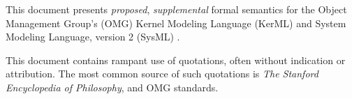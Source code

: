 

This document presents \emph{proposed}, \emph{supplemental} formal semantics for the Object Management Group's (OMG) Kernel Modeling Language (KerML) \cite{KerML} and System Modeling Language, version 2 (SysML) \cite{SysML}. 

This document contains rampant use of quotations, often without indication or attribution.
The most common source of such quotations is \emph{The Stanford Encyclopedia of Philosophy}\cite{PLATO}, and OMG standards.



{\color{glossarycolor}\begin{center}\end{center}}

